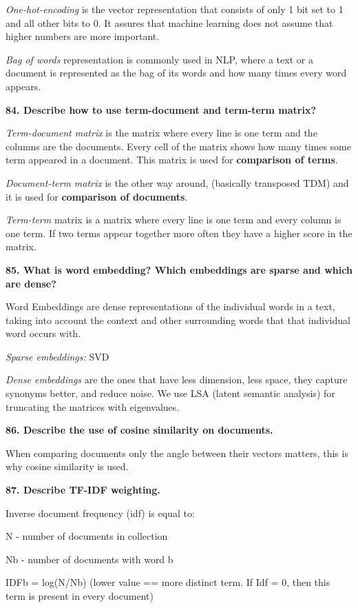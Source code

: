 \textit{One-hot-encoding} is the vector representation that consists
of only 1 bit set to 1 and all other bits to 0. It assures that machine
learning does not assume that higher numbers are more important.

\textit{Bag of words} representation is commonly used in NLP, where a
text or a document is represented as the bag of its words and how many
times every word appears.

\textbf{84. Describe how to use term-document and term-term matrix?}

\textit{Term-document matrix} is the matrix where every line is one
term and the columns are the documents. Every cell of the matrix shows
how many times some term appeared in a document. This matrix is used for
\textbf{comparison of terms}.

\textit{Document-term matrix} is the other way around, (basically
transposed TDM) and it is used for \textbf{comparison of documents}.

\textit{Term-term} matrix is a matrix where every line is one term
and every column is one term. If two terms appear together more often
they have a higher score in the matrix.

\textbf{85. What is word embedding? Which embeddings are sparse and
which are dense?}

Word Embeddings are dense representations of the individual words in a
text, taking into account the context and other surrounding words that
that individual word occurs with.

\textit{Sparse embeddings:} SVD

\textit{Dense embeddings} are the ones that have less dimension, less
space, they capture synonyms better, and reduce noise. We use LSA
(latent semantic analysis) for truncating the matrices with eigenvalues.

\textbf{86. Describe the use of cosine similarity on documents.}

When comparing documents only the angle between their vectors matters,
this is why cosine similarity is used.

\textbf{87. Describe TF-IDF weighting.}

Inverse document frequency (idf) is equal to:

N - number of documents in collection

Nb - number of documents with word b

IDFb = log(N/Nb) (lower value == more distinct term. If Idf = 0, then
this term is present in every document)


